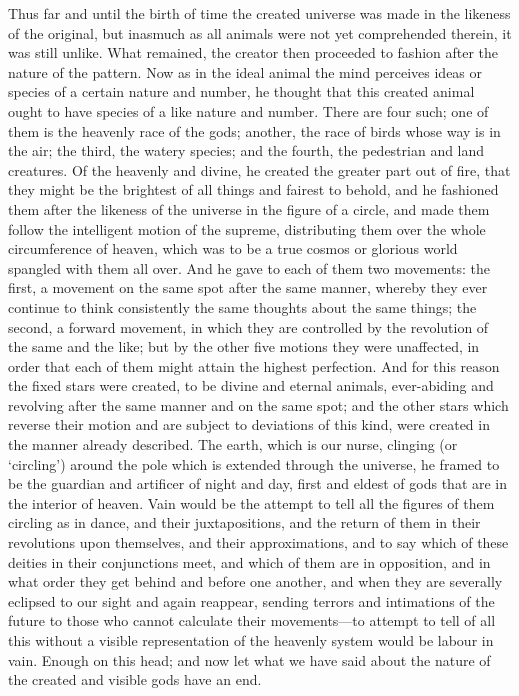 Thus far and until the birth of time the created universe was made in the
likeness of the original, but inasmuch as all animals were not yet
comprehended therein, it was still unlike. What remained, the creator then
proceeded to fashion after the nature of the pattern. Now as in the ideal
animal the mind perceives ideas or species of a certain nature and number,
he thought that this created animal ought to have species of a like nature
and number. There are four such; one of them is the heavenly race of the
gods; another, the race of birds whose way is in the air; the third, the
watery species; and the fourth, the pedestrian and land creatures. Of the
heavenly and divine, he created the greater part out of fire, that they
might be the brightest of all things and fairest to behold, and he
fashioned them after the likeness of the universe in the figure of a
circle, and made them follow the intelligent motion of the supreme,
distributing them over the whole circumference of heaven, which was to be
a true cosmos or glorious world spangled with them all over. And he gave
to each of them two movements: the first, a movement on the same spot
after the same manner, whereby they ever continue to think consistently
the same thoughts about the same things; the second, a forward movement,
in which they are controlled by the revolution of the same and the like;
but by the other five motions they were unaffected, in order that each of
them might attain the highest perfection. And for this reason the fixed
stars were created, to be divine and eternal animals, ever-abiding and
revolving after the same manner and on the same spot; and the other stars
which reverse their motion and are subject to deviations of this kind,
were created in the manner already described. The earth, which is our
nurse, clinging (or ‘circling’) around the pole which is extended through
the universe, he framed to be the guardian and artificer of night and day,
first and eldest of gods that are in the interior of heaven. Vain would be
the attempt to tell all the figures of them circling as in dance, and
their juxtapositions, and the return of them in their revolutions upon
themselves, and their approximations, and to say which of these deities in
their conjunctions meet, and which of them are in opposition, and in what
order they get behind and before one another, and when they are severally
eclipsed to our sight and again reappear, sending terrors and intimations
of the future to those who cannot calculate their movements—to
attempt to tell of all this without a visible representation of the
heavenly system would be labour in vain. Enough on this head; and now let
what we have said about the nature of the created and visible gods have an
end.

